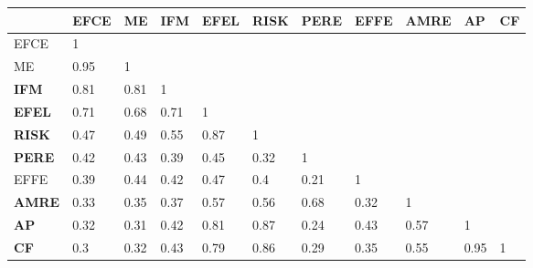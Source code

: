 \begin{tabular}{lllllllllll}
\toprule
{} &  EFCE &    ME & \textbf{IFM} & \textbf{EFEL} & \textbf{RISK} & \textbf{PERE} &  EFFE & \textbf{AMRE} & \textbf{AP} & \textbf{CF} \\
\midrule
EFCE          &     1 &       &              &               &               &               &       &               &             &             \\
ME            &  0.95 &     1 &              &               &               &               &       &               &             &             \\
\textbf{IFM}  &  0.81 &  0.81 &            1 &               &               &               &       &               &             &             \\
\textbf{EFEL} &  0.71 &  0.68 &         0.71 &             1 &               &               &       &               &             &             \\
\textbf{RISK} &  0.47 &  0.49 &         0.55 &          0.87 &             1 &               &       &               &             &             \\
\textbf{PERE} &  0.42 &  0.43 &         0.39 &          0.45 &          0.32 &             1 &       &               &             &             \\
EFFE          &  0.39 &  0.44 &         0.42 &          0.47 &           0.4 &          0.21 &     1 &               &             &             \\
\textbf{AMRE} &  0.33 &  0.35 &         0.37 &          0.57 &          0.56 &          0.68 &  0.32 &             1 &             &             \\
\textbf{AP}   &  0.32 &  0.31 &         0.42 &          0.81 &          0.87 &          0.24 &  0.43 &          0.57 &           1 &             \\
\textbf{CF}   &   0.3 &  0.32 &         0.43 &          0.79 &          0.86 &          0.29 &  0.35 &          0.55 &        0.95 &           1 \\
\bottomrule
\end{tabular}
